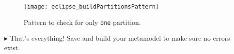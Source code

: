 \begin{itemize}
\clearpage

\vspace*{2cm}

\begin{figure}[htp]
\begin{center}
  \texttt{[image: eclipse\_buildPartitionsPattern]}
  \caption{Pattern to check for only \texttt{one} partition.}
  \label{fig:pattBuildParts}
\end{center}
\end{figure}

\item[$\blacktriangleright$] That's everything! Save and build your metamodel to make sure no errors exist.

\end{itemize}
